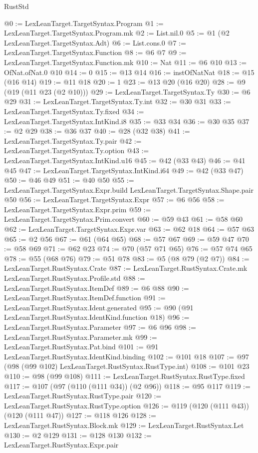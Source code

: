 \begin{lexlean}{RustStd}
\begin{coremodule}
@0 := LexLeanTarget.TargetSyntax.Program
@1 := LexLeanTarget.TargetSyntax.Program.mk
@2 := List.nil.{0}
@5 := @1 (@2 LexLeanTarget.TargetSyntax.Adt)
@6 := List.cons.{0}
@7 := LexLeanTarget.TargetSyntax.Function
@8 := @6 @7
@9 := LexLeanTarget.TargetSyntax.Function.mk
@10 := Nat
@11 := @6 @10
@13 := OfNat.ofNat.{0} @10
@14 := 0
@15 := @13 @14
@16 := instOfNatNat
@18 := @15 (@16 @14)
@19 := @11 @18
@20 := 1
@23 := @13 @20 (@16 @20)
@28 := @9 (@19 (@11 @23 (@2 @10)))
@29 := LexLeanTarget.TargetSyntax.Ty
@30 := @6 @29
@31 := LexLeanTarget.TargetSyntax.Ty.int
@32 := @30 @31
@33 := LexLeanTarget.TargetSyntax.Ty.fixed
@34 := LexLeanTarget.TargetSyntax.IntKind.i8
@35 := @33 @34
@36 := @30 @35
@37 := @2 @29
@38 := @36 @37
@40 := @28 (@32 @38)
@41 := LexLeanTarget.TargetSyntax.Ty.pair
@42 := LexLeanTarget.TargetSyntax.Ty.option
@43 := LexLeanTarget.TargetSyntax.IntKind.u16
@45 := @42 (@33 @43)
@46 := @41 @45
@47 := LexLeanTarget.TargetSyntax.IntKind.i64
@49 := @42 (@33 @47)
@50 := @46 @49
@51 := @40 @50
@55 := LexLeanTarget.TargetSyntax.Expr.build LexLeanTarget.TargetSyntax.Shape.pair @50
@56 := LexLeanTarget.TargetSyntax.Expr
@57 := @6 @56
@58 := LexLeanTarget.TargetSyntax.Expr.prim
@59 := LexLeanTarget.TargetSyntax.Prim.convert
@60 := @59 @43
@61 := @58 @60
@62 := LexLeanTarget.TargetSyntax.Expr.var
@63 := @62 @18
@64 := @57 @63
@65 := @2 @56
@67 := @61 (@64 @65)
@68 := @57 @67
@69 := @59 @47
@70 := @58 @69
@71 := @62 @23
@74 := @70 (@57 @71 @65)
@76 := @57 @74 @65
@78 := @55 (@68 @76)
@79 := @51 @78
@83 := @5 (@8 @79 (@2 @7))
@84 := LexLeanTarget.RustSyntax.Crate
@87 := LexLeanTarget.RustSyntax.Crate.mk LexLeanTarget.RustSyntax.Profile.std
@88 := LexLeanTarget.RustSyntax.ItemDef
@89 := @6 @88
@90 := LexLeanTarget.RustSyntax.ItemDef.function
@91 := LexLeanTarget.RustSyntax.Ident.generated
@95 := @90 (@91 LexLeanTarget.RustSyntax.IdentKind.function @18)
@96 := LexLeanTarget.RustSyntax.Parameter
@97 := @6 @96
@98 := LexLeanTarget.RustSyntax.Parameter.mk
@99 := LexLeanTarget.RustSyntax.Pat.bind
@101 := @91 LexLeanTarget.RustSyntax.IdentKind.binding
@102 := @101 @18
@107 := @97 (@98 (@99 @102) LexLeanTarget.RustSyntax.RustType.int)
@108 := @101 @23
@110 := @98 (@99 @108)
@111 := LexLeanTarget.RustSyntax.RustType.fixed
@117 := @107 (@97 (@110 (@111 @34)) (@2 @96))
@118 := @95 @117
@119 := LexLeanTarget.RustSyntax.RustType.pair
@120 := LexLeanTarget.RustSyntax.RustType.option
@126 := @119 (@120 (@111 @43)) (@120 (@111 @47))
@127 := @118 @126
@128 := LexLeanTarget.RustSyntax.Block.mk
@129 := LexLeanTarget.RustSyntax.Let
@130 := @2 @129
@131 := @128 @130
@132 := LexLeanTarget.RustSyntax.Expr.pair

\end{coremodule}
\end{lexlean}
